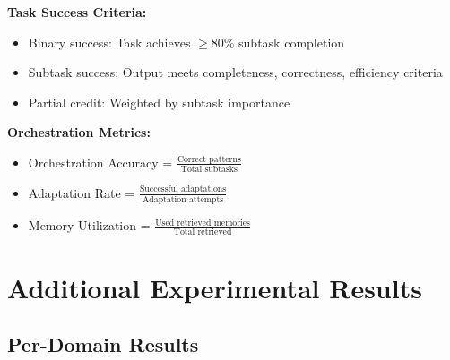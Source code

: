 \documentclass{article}
\theoremstyle{plain}
\theoremstyle{definition}
\theoremstyle{remark}
\begin{document}
\textbf{Task Success Criteria:}
\begin{itemize}[nosep]
	\item Binary success: Task achieves $\geq$80\% subtask completion
	\item Subtask success: Output meets completeness, correctness, efficiency criteria
	\item Partial credit: Weighted by subtask importance
\end{itemize}

\textbf{Orchestration Metrics:}
\begin{itemize}[nosep]
	\item Orchestration Accuracy = $\frac{\text{Correct patterns}}{\text{Total subtasks}}$
	\item Adaptation Rate = $\frac{\text{Successful adaptations}}{\text{Adaptation attempts}}$
	\item Memory Utilization = $\frac{\text{Used retrieved memories}}{\text{Total retrieved}}$
\end{itemize}

\section{Additional Experimental Results}
\label{app:results}

\subsection{Per-Domain \mars{} Results}
\end{document}
